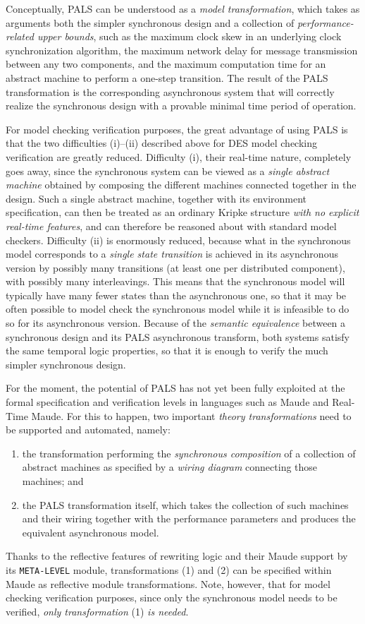 \documentclass[copyright,creativecommons]{eptcs}
\begin{document}
Conceptually, PALS can be understood as a \emph{model transformation},  which
takes as arguments both the simpler synchronous design and a collection of
\emph{performance-related upper bounds}, such as the maximum clock skew in an
underlying clock synchronization algorithm, the maximum network delay for
message transmission between any two components, and the maximum computation
time for an abstract machine to perform a one-step transition.  The result of
the PALS transformation is the corresponding asynchronous system that will
correctly realize the synchronous design with a provable minimal time period of
operation.

For model checking verification purposes, the great advantage of using PALS is
that the two difficulties (i)--(ii) described above for DES model checking
verification are greatly reduced.  Difficulty (i), their real-time nature,
completely goes away, since the synchronous system can be viewed as a
\emph{single abstract machine} obtained by composing the different machines
connected together in the design.  Such a single abstract machine, together
with its environment specification, can then be treated as an ordinary Kripke
structure \emph{with no explicit real-time features}, and can therefore be reasoned
about with standard model checkers.  Difficulty (ii) is enormously reduced,
because what in the synchronous model corresponds to a \emph{single state
transition} is achieved in its asynchronous version by possibly many transitions
(at least one per distributed component), with possibly many interleavings.
This means that the synchronous model will typically have many fewer states
than the asynchronous one, so that it may be often possible to model check the
synchronous model while it is infeasible to do so for its asynchronous version.
Because of the \emph{semantic equivalence} between a synchronous design and its
PALS asynchronous transform, both systems satisfy the same temporal logic
properties, so that it is enough to verify the much simpler synchronous design.

For the moment, the potential of PALS has not yet been fully exploited at the
formal specification and verification levels in languages such as Maude and
Real-Time Maude.  For this to happen, two important \emph{theory
transformations} need to be supported and automated, namely: 
\begin{enumerate}
\item the transformation performing the \emph{synchronous composition} of a
collection of abstract machines as specified by a \emph{wiring diagram}
connecting those machines; and

\item the PALS transformation itself, which takes the collection of such
machines and their wiring together with the performance parameters and produces
the equivalent asynchronous model.  
\end{enumerate} 
Thanks to the reflective features of rewriting logic and their Maude support by
its \texttt{META-LEVEL} module, transformations (1) and (2) can be specified
within Maude as reflective module transformations.  Note, however, that for
model checking verification purposes, since only the synchronous model needs to
be verified, \emph{only transformation} (1) \emph{is needed}.
\end{document}
